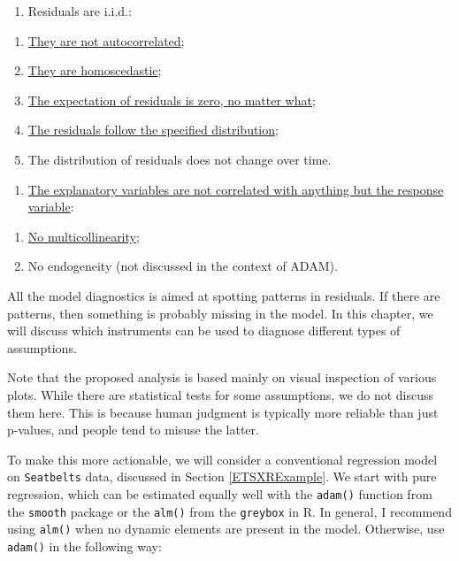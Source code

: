 \documentclass[
]{book}
\providecommand{\tightlist}{%
  \setlength{\itemsep}{0pt}\setlength{\parskip}{0pt}}
\theoremstyle{definition}
\theoremstyle{definition}
\theoremstyle{definition}
\theoremstyle{definition}
\theoremstyle{remark}
\begin{document}
\begin{enumerate}
\def\labelenumi{\arabic{enumi}.}
\setcounter{enumi}{1}
\tightlist
\item
  Residuals are i.i.d.:
\end{enumerate}

\begin{enumerate}
\def\labelenumi{\alph{enumi}.}
\tightlist
\item
  \protect\hyperlink{diagnosticsResidualsIIDAuto}{They are not autocorrelated};
\item
  \protect\hyperlink{diagnosticsResidualsIIDHetero}{They are homoscedastic};
\item
  \protect\hyperlink{diagnosticsResidualsIIDExpectation}{The expectation of residuals is zero, no matter what};
\item
  \protect\hyperlink{diagnosticsResidualsIIDDistribution}{The residuals follow the specified distribution};
\item
  The distribution of residuals does not change over time.
\end{enumerate}

\begin{enumerate}
\def\labelenumi{\arabic{enumi}.}
\setcounter{enumi}{2}
\tightlist
\item
  \protect\hyperlink{diagnosticsMulticollinearity}{The explanatory variables are not correlated with anything but the response variable}:
\end{enumerate}

\begin{enumerate}
\def\labelenumi{\alph{enumi}.}
\tightlist
\item
  \protect\hyperlink{diagnosticsMulticollinearity}{No multicollinearity};
\item
  No endogeneity (not discussed in the context of ADAM).
\end{enumerate}

All the model diagnostics is aimed at spotting patterns in residuals. If there are patterns, then something is probably missing in the model. In this chapter, we will discuss which instruments can be used to diagnose different types of assumptions.

Note that the proposed analysis is based mainly on visual inspection of various plots. While there are statistical tests for some assumptions, we do not discuss them here. This is because human judgment is typically more reliable than just p-values, and people tend to misuse the latter.

To make this more actionable, we will consider a conventional regression model on \texttt{Seatbelts} data, discussed in Section \ref{ETSXRExample}. We start with pure regression, which can be estimated equally well with the \texttt{adam()} function from the \texttt{smooth} package or the \texttt{alm()} from the \texttt{greybox} in R. In general, I recommend using \texttt{alm()} when no dynamic elements are present in the model. Otherwise, use \texttt{adam()} in the following way:
\end{document}
